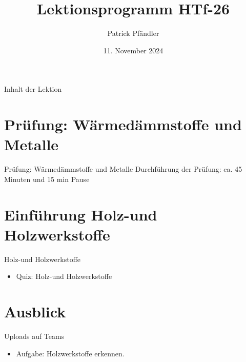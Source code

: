 

\title{\textbf{Lektionsprogramm HTf-26}}
\author{Patrick Pfändler}
\date{11. November 2024}




\frame{\titlepage}

\begin{frame}{Inhalt der Lektion}
    \tableofcontents
\end{frame}


\section{Prüfung: Wärmedämmstoffe und Metalle}
\begin{frame}{Prüfung: Wärmedämmstoffe und Metalle}
Durchführung der Prüfung: ca. 45 Minuten und 15 min Pause
\end{frame}


\section{Einführung Holz-und Holzwerkstoffe}
\begin{frame}{Holz-und Holzwerkstoffe}
\begin{itemize}
	\item[\textbullet] Quiz: Holz-und Holzwerkstoffe
\end{itemize}	
\end{frame}
\section{Ausblick}


\begin{frame}{Uploads auf Teams }
    \begin{itemize}
        \item[\textbullet] Aufgabe: Holzwerkstoffe erkennen.
    \end{itemize}
    
\end{frame}

    
\folieFragen


